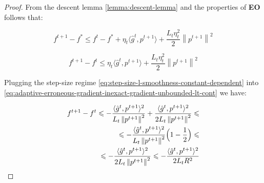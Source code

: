 \documentclass[runningheads, draft]{llncs}
\newcommand{\norm}[1]{\left\lVert#1\right\rVert}
\newcommand{\vprod}[1]{\langle#1\rangle}
\newcommand{\errgrad}{\hat{g}}
\begin{document}
\begin{proof}
    From the descent lemma \eqref{lemma:descent-lemma} and
    the properties of \textbf{EO} follows that:

    \begin{equation}\label{eq:adaptive-erroneous-gradient-inexact-gradient-unbounded-lt}
        f^{t+1} - f^* \leqslant f^t - f^* + \eta_t \vprod{\errgrad^t, p^{t+1}} +
        \frac{L_t \eta_t^2}{2} \norm{p^{t+1}}^2
    \end{equation}

    \begin{equation}\label{eq:adaptive-erroneous-gradient-inexact-gradient-unbounded-lt-cont}
        f^{t+1} - f^t \leqslant \eta_t \vprod{\errgrad^t, p^{t+1}} +
        \frac{L_t \eta_t^2}{2} \norm{p^{t+1}}^2
    \end{equation}

    Plugging the step-size regime
    \eqref{eq:step-size-l-smoothness-constant-dependent} into
    \eqref{eq:adaptive-erroneous-gradient-inexact-gradient-unbounded-lt-cont}
    we have:

    \begin{equation}
        \begin{split}
            f^{t+1} - f^t \leqslant
            -\frac{\vprod{\errgrad^t, p^{t+1}}^2}{L_t\norm{p^{t+1}}^2} +
            \frac{\vprod{\errgrad^t, p^{t+1}}^2}{2L_t\norm{p^{t+1}}^2}
            \leqslant                             \\
            \leqslant -\frac{\vprod{\errgrad^t, p^{t+1}}^2}{L_t\norm{p^{t+1}}^2}
            \Bigl(1 - \frac{1}{2}\Bigr) \leqslant \\
            \leqslant -\frac{\vprod{\errgrad^t, p^{t+1}}^2}{2L_t\norm{p^{t+1}}^2}
            \leqslant -\frac{\vprod{\errgrad^t, p^{t+1}}^2}{2L_tR^2}
        \end{split}
    \end{equation}

\end{proof}
%
\end{document}
